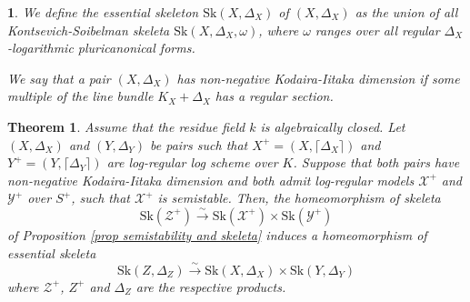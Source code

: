 \documentclass{amsart}%
\numberwithin{equation}{subsection}
\theoremstyle{plain2}
\newtheorem{theorem}[equation]{Theorem}
\theoremstyle{definition2}
\theoremstyle{stepstyle}
\theoremstyle{point}
\theoremstyle{subpoint}
\newtheorem{subpoint}[equation]{}%
\newcommand{\spa}[1]{\begin{subpoint}#1\end{subpoint}}           %
\newcommand{\cX}{\ensuremath{\mathscr{X}}}
\newcommand{\cY}{\ensuremath{\mathscr{Y}}}
\newcommand{\cZ}{\ensuremath{\mathscr{Z}}}
\renewcommand{\cZ}{\ensuremath{\mathscr{Z}}}
\renewcommand{\cY}{\ensuremath{\mathscr{Y}}}
\newcommand{\Sk}{\mathrm{Sk}}
\begin{document}
\spa{We define the essential skeleton $\Sk(X,\Delta_X)$ of $(X,\Delta_X)$ as the union of all Kontsevich-Soibelman skeleta $\Sk(X, \Delta_X,\omega)$, where $\omega$ ranges over all regular $\Delta_X$-logarithmic pluricanonical forms. 

We say that a pair $(X,\Delta_X)$ has non-negative Kodaira-Iitaka dimension if some multiple of the line bundle $K_X + \Delta_X$ has a regular section.}
\begin{theorem} \label{thm essential skeleton of product via log-reg}
Assume that the residue field $k$ is algebraically closed. Let $(X,\Delta_X)$ and $(Y,\Delta_Y)$ be pairs such that $X^+=(X,\lceil \Delta_X \rceil)$ and $Y^+=(Y, \lceil \Delta_Y\rceil)$ are log-regular log scheme over $K$. Suppose that both pairs have non-negative Kodaira-Iitaka dimension and both admit log-regular models $\cX^+$ and $\cY^+$ over $S^+$, such that $\cX^+$ is semistable. Then, the homeomorphism of skeleta $$\Sk(\cZ^+) \xrightarrow{\sim} \Sk(\cX^+) \times \Sk(\cY^+)$$of Proposition \ref{prop semistability and skeleta} induces a homeomorphism of essential skeleta $$\Sk(Z,\Delta_Z) \xrightarrow{\sim} \Sk(X,\Delta_X) \times \Sk(Y,\Delta_Y)$$ where $\cZ^+$, $Z^+$ and $\Delta_Z$ are the respective products. 
\end{theorem}
\end{document}
